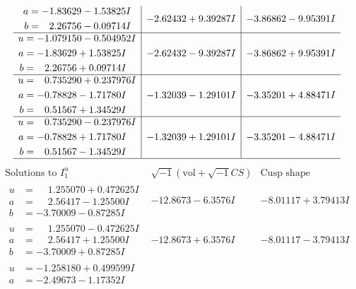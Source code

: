 \documentclass[1p]{elsarticle_modified}
\theoremstyle{definition}
\newcommand{\I}{\sqrt{-1}}
\begin{document}
$$\begin{array}{c|c|c}
\begin{aligned}
a &= -1.83629 - 1.53825 I \\
b &= \phantom{-}2.26756 - 0.09714 I\end{aligned}
 & -2.62432 + 9.39287 I & -3.86862 - 9.95391 I \\ \hline\begin{aligned}
u &= -1.079150 - 0.504952 I \\
a &= -1.83629 + 1.53825 I \\
b &= \phantom{-}2.26756 + 0.09714 I\end{aligned}
 & -2.62432 - 9.39287 I & -3.86862 + 9.95391 I \\ \hline\begin{aligned}
u &= \phantom{-}0.735290 + 0.237976 I \\
a &= -0.78828 - 1.71780 I \\
b &= \phantom{-}0.51567 + 1.34529 I\end{aligned}
 & -1.32039 - 1.29101 I & -3.35201 + 4.88471 I \\ \hline\begin{aligned}
u &= \phantom{-}0.735290 - 0.237976 I \\
a &= -0.78828 + 1.71780 I \\
b &= \phantom{-}0.51567 - 1.34529 I\end{aligned}
 & -1.32039 + 1.29101 I & -3.35201 - 4.88471 I\\
 \hline 
 \end{array}$$\newpage$$\begin{array}{c|c|c}  
\text{Solutions to }I^u_{1}& \I (\text{vol} + \sqrt{-1}CS) & \text{Cusp shape}\\
 \hline 
\begin{aligned}
u &= \phantom{-}1.255070 + 0.472625 I \\
a &= \phantom{-}2.56417 - 1.25500 I \\
b &= -3.70009 - 0.87285 I\end{aligned}
 & -12.8673 - 6.3576 I & -8.01117 + 3.79413 I \\ \hline\begin{aligned}
u &= \phantom{-}1.255070 - 0.472625 I \\
a &= \phantom{-}2.56417 + 1.25500 I \\
b &= -3.70009 + 0.87285 I\end{aligned}
 & -12.8673 + 6.3576 I & -8.01117 - 3.79413 I \\ \hline\begin{aligned}
u &= -1.258180 + 0.499599 I \\
a &= -2.49673 - 1.17352 I \\

\end{aligned}
\end{array}$$
\end{document}
